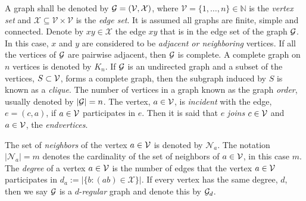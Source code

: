\documentclass[letterpaper, 11 pt, conference]{ieeeconf}  %
\begin{document}
\medskip

A graph shall be denoted by $\mathcal{G} = (\mathcal{V},\mathcal{X})$, where $\mathcal{V} = \{1,\ldots, n\} \in \mathbb{N}$ is the \textit{vertex set} and $\mathcal{X} \subseteq \mathcal{V} \times \mathcal{V}$ is the \textit{edge set}. It is assumed all graphs are finite, simple and connected.  Denote by $xy \in \mathcal{X}$ the edge $xy$ that is in the edge set of the graph $\mathcal{G}$. In this case, $x$ and $y$ are considered to be \textit{adjacent or neighboring} vertices.  If all the vertices of $\mathcal{G}$ are pairwise adjacent, then $\mathcal{G}$ is complete.  A complete graph on $n$ vertices is denoted by $K_n$.  If $\mathcal{G}$ is an undirected graph and a subset of the vertices, $S \subset \mathcal{V}$, forms a complete graph, then the subgraph induced by $S$ is known as a \textit{clique}. The number of vertices in a graph known as the graph \textit{order}, usually denoted by $|\mathcal{G}|=n$. The vertex, $a \in \mathcal{V}$, is \textit{incident} with the edge, $e=(c,a)$, if $a \in \mathcal{V}$ participates in $e$.  Then it is said that $e$ \textit{joins} $c \in \mathcal{V}$ and $a \in \mathcal{V}$, the \textit{endvertices}.

\medskip

The set of \textit{neighbors} of the vertex $a \in \mathcal{V}$ is denoted by $\mathcal{N}_a$. The notation $|\mathcal{N}_a|=m$ denotes the cardinality of the set of neighbors of $a \in \mathcal{V}$, in this case $m$. The \textit{degree} of a vertex $a \in \mathcal{V}$ is the number of edges that the vertex $a \in \mathcal{V}$ participates in $d_a := |\{b: (ab) \in \mathcal{X}\}|$. If every vertex has the same degree, $d$, then we say $\mathcal{G}$ is a $d$-\textit{regular} graph and denote this by $\mathcal{G}_d$. 

\medskip 
\end{document}
